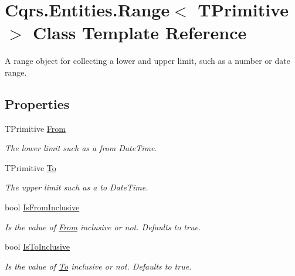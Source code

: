 \hypertarget{classCqrs_1_1Entities_1_1Range}{}\section{Cqrs.\+Entities.\+Range$<$ T\+Primitive $>$ Class Template Reference}
\label{classCqrs_1_1Entities_1_1Range}


A range object for collecting a lower and upper limit, such as a number or date range.  


\subsection*{Properties}
\begin{DoxyCompactItemize}
\item 
T\+Primitive \hyperlink{classCqrs_1_1Entities_1_1Range_a373db08544a25cb6d53411f56e0e072a_a373db08544a25cb6d53411f56e0e072a}{From}
\begin{DoxyCompactList}\small\item\em The lower limit such as a from Date\+Time. \end{DoxyCompactList}\item 
T\+Primitive \hyperlink{classCqrs_1_1Entities_1_1Range_a06daca38005d4f4ff2156b99a95d2f92_a06daca38005d4f4ff2156b99a95d2f92}{To}
\begin{DoxyCompactList}\small\item\em The upper limit such as a to Date\+Time. \end{DoxyCompactList}\item 
bool \hyperlink{classCqrs_1_1Entities_1_1Range_a135f90a2f05344538e79a40b5da28378_a135f90a2f05344538e79a40b5da28378}{Is\+From\+Inclusive}
\begin{DoxyCompactList}\small\item\em Is the value of \hyperlink{classCqrs_1_1Entities_1_1Range_a373db08544a25cb6d53411f56e0e072a_a373db08544a25cb6d53411f56e0e072a}{From} inclusive or not. Defaults to true. \end{DoxyCompactList}\item 
bool \hyperlink{classCqrs_1_1Entities_1_1Range_a14cc90fd0525d94b2f3d4c69f19d013e_a14cc90fd0525d94b2f3d4c69f19d013e}{Is\+To\+Inclusive}
\begin{DoxyCompactList}\small\item\em Is the value of \hyperlink{classCqrs_1_1Entities_1_1Range_a06daca38005d4f4ff2156b99a95d2f92_a06daca38005d4f4ff2156b99a95d2f92}{To} inclusive or not. Defaults to true. \end{DoxyCompactList}\end{DoxyCompactItemize}


